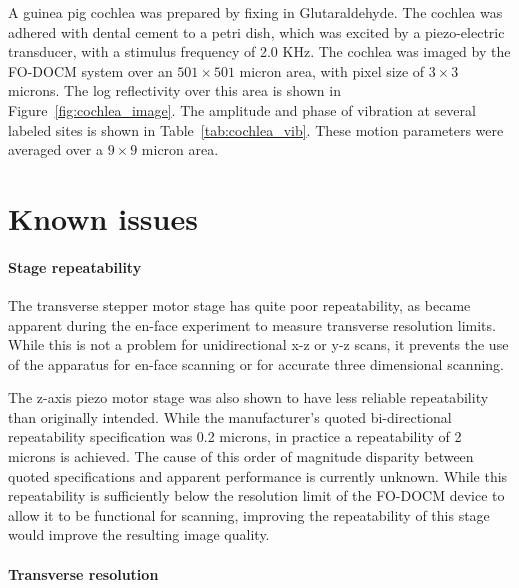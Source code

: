 A guinea pig cochlea was prepared by fixing in Glutaraldehyde. The cochlea was adhered with dental cement to a petri dish, which was excited by a piezo-electric transducer, with a stimulus frequency of 2.0 KHz. The cochlea was imaged by the FO-DOCM system over an $501 \times 501$ micron area, with pixel size of $3 \times 3$ microns. The log reflectivity over this area is shown in Figure~\ref{fig:cochlea_image}. The amplitude and phase of vibration at several labeled sites is shown in Table~\ref{tab:cochlea_vib}. These motion parameters were averaged over a $9 \times 9$ micron area.

\section{Known issues}
\label{sec:known_issues}



\paragraph{Stage repeatability}

The transverse stepper motor stage has quite poor repeatability, as became apparent during the en-face experiment to measure transverse resolution limits. While this is not a problem for unidirectional x-z or y-z scans, it prevents the use of the apparatus for en-face scanning or for accurate three dimensional scanning.

The z-axis piezo motor stage was also shown to have less reliable repeatability than originally intended. While the manufacturer's quoted bi-directional repeatability specification was 0.2 microns, in practice a repeatability of 2 microns is achieved. The cause of this order of magnitude disparity between quoted specifications and apparent performance is currently unknown. While this repeatability is sufficiently below the resolution limit of the FO-DOCM device to allow it to be functional for scanning, improving the repeatability of this stage would improve the resulting image quality.

\paragraph{Transverse resolution}

